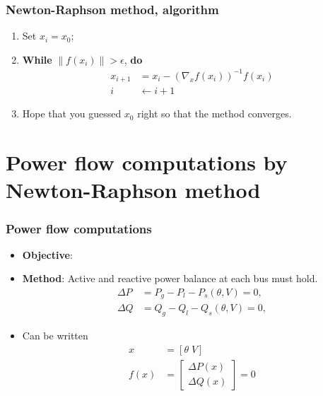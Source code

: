 \documentclass{beamer}
\newcommand\norm[1]{\left\lVert#1\right\rVert}
\begin{document}
\begin{frame}
  \frametitle{Newton-Raphson method, algorithm}
  \begin{enumerate}
  \item Set $x_i = x_0$;
  \item \textbf{While} $\norm{f(x_i)}> \epsilon$, \textbf{do}
    \begin{align*}
      x_{i+1} &= x_i - \left(\nabla_x f(x_i) \right)^{-1} f(x_i)\\
      i &\leftarrow i+1
    \end{align*}
  \item Hope that you guessed $x_0$ right so that the method converges.
  \end{enumerate}
\end{frame}

\section[Power flow]{Power flow computations by Newton-Raphson method}

\begin{frame}
  \frametitle{Power flow computations}
  \begin{itemize}
  \item \textbf{Objective}:  
  \item<3-> \textbf{Method}: Active and reactive power balance at each bus must hold.
    \begin{align}
      \Delta P &= P_g - P_l - P_s(\theta,V) = 0,\\
      \Delta Q &= Q_g - Q_l - Q_s(\theta,V) = 0,
    \end{align}
  \item<4> Can be written
    \begin{align}
      x &= [\theta \; V] \\
      f(x) &= \begin{bmatrix}
      \Delta P(x)\\
      \Delta Q(x)
      \end{bmatrix}=0
    \end{align}
  \end{itemize}
\end{frame}
\end{document}
